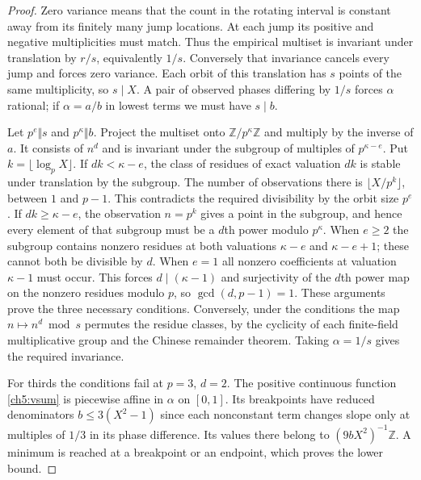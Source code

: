 \documentclass[11pt,a4paper,oneside,openany]{report}
\theoremstyle{remark}\newtheorem{remark}[theorem]{Remark}
\numberwithin{equation}{section}
\begin{document}
\begin{proof}
Zero variance means that the count in the rotating interval is constant away from its finitely many jump locations. At each jump its positive and negative multiplicities must match. Thus the empirical multiset is invariant under translation by $r/s$, equivalently $1/s$. Conversely that invariance cancels every jump and forces zero variance. Each orbit of this translation has $s$ points of the same multiplicity, so $s\mid X$. A pair of observed phases differing by $1/s$ forces $\alpha$ rational; if $\alpha=a/b$ in lowest terms we must have $s\mid b$.

Let $p^e\Vert s$ and $p^\kappa\Vert b$. Project the multiset onto $\mathbb Z/p^\kappa\mathbb Z$ and multiply by the inverse of $a$. It consists of $n^d$ and is invariant under the subgroup of multiples of $p^{\kappa-e}$. Put $k=\lfloor\log_p X\rfloor$. If $dk<\kappa-e$, the class of residues of exact valuation $dk$ is stable under translation by the subgroup. The number of observations there is $\lfloor X/p^k\rfloor$, between $1$ and $p-1$. This contradicts the required divisibility by the orbit size $p^e$. If $dk\ge\kappa-e$, the observation $n=p^k$ gives a point in the subgroup, and hence every element of that subgroup must be a $d$th power modulo $p^\kappa$. When $e\ge2$ the subgroup contains nonzero residues at both valuations $\kappa-e$ and $\kappa-e+1$; these cannot both be divisible by $d$. When $e=1$ all nonzero coefficients at valuation $\kappa-1$ must occur. This forces $d\mid(\kappa-1)$ and surjectivity of the $d$th power map on the nonzero residues modulo $p$, so $\gcd(d,p-1)=1$. These arguments prove the three necessary conditions. Conversely, under the conditions the map $n\mapsto n^d\bmod s$ permutes the residue classes, by the cyclicity of each finite-field multiplicative group and the Chinese remainder theorem. Taking $\alpha=1/s$ gives the required invariance.

For thirds the conditions fail at $p=3$, $d=2$. The positive continuous function \eqref{ch5:vsum} is piecewise affine in $\alpha$ on $[0,1]$. Its breakpoints have reduced denominators $b\le3(X^2-1)$ since each nonconstant term changes slope only at multiples of $1/3$ in its phase difference. Its values there belong to $(9bX^2)^{-1}\mathbb Z$. A minimum is reached at a breakpoint or an endpoint, which proves the lower bound.
\end{proof}
\end{document}
